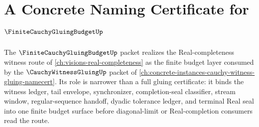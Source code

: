 \chapter{A Concrete Naming Certificate for $\FiniteCauchyGluingBudgetUp$}
\label{ch:concrete-instances-finitecauchygluingbudget-namecert}

The $\FiniteCauchyGluingBudgetUp$ packet realizes the Real-completeness witness route of \autoref{ch:visions-real-completeness} as the finite budget layer consumed by the $\CauchyWitnessGluingUp$ packet of \autoref{ch:concrete-instances-cauchy-witness-gluing-namecert}. Its role is narrower than a full gluing certificate: it binds the witness ledger, tail envelope, synchronizer, completion-seal classifier, stream window, regular-sequence handoff, dyadic tolerance ledger, and terminal Real seal into one finite budget surface before diagonal-limit or Real-completion consumers read the route.

